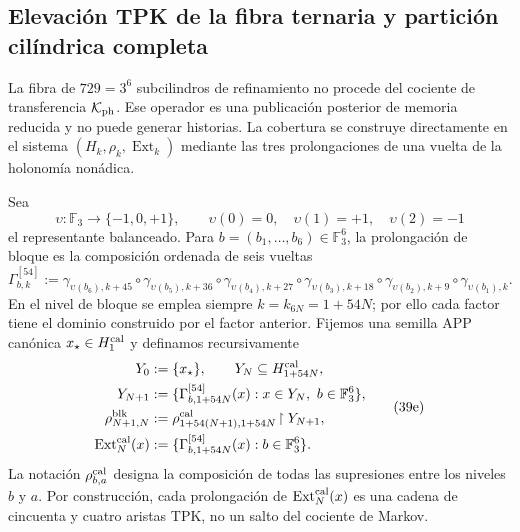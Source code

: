 \subsection{Elevación TPK de la fibra ternaria y partición cilíndrica completa}
\label{subsec:elevacion-catalogal-ch}

La fibra de \(729=3^6\) subcilindros de refinamiento no procede del cociente de transferencia
\(\mathcal K_{\rm ph}\). Ese operador es una publicación posterior de memoria
reducida y no puede generar historias. La cobertura se construye directamente
en el sistema \((H_k,\rho_k,\operatorname{Ext}_k)\) mediante las tres
prolongaciones de una vuelta de la holonomía nonádica.





Sea
\[
 \upsilon:\mathbb F_3\longrightarrow\{-1,0,+1\},\qquad
 \upsilon(0)=0,\quad\upsilon(1)=+1,\quad\upsilon(2)=-1
\]
el representante balanceado. Para
\(b=(b_1,\ldots,b_6)\in\mathbb F_3^6\), la prolongación de bloque es la
composición ordenada de seis vueltas
\[
 \Gamma_{b,k}^{[54]}:=
 \gamma_{\upsilon(b_6),k+45}\circ\gamma_{\upsilon(b_5),k+36}\circ
 \gamma_{\upsilon(b_4),k+27}\circ\gamma_{\upsilon(b_3),k+18}\circ
 \gamma_{\upsilon(b_2),k+9}\circ\gamma_{\upsilon(b_1),k}.
\tag{39d}
\label{eq:gamma-bloque-54-ch}
\]
En el nivel de bloque se emplea siempre
\(k=k_{6N}=1+54N\); por ello cada factor tiene el dominio construido por el
factor anterior.
Fijemos una semilla APP canónica \(x_\star\in H^{\rm cal}_1\) y definamos
recursivamente
\[
 \begin{aligned}
  Y_0&:=\{x_\star\},\qquad Y_N\subseteq H_{1+54N}^{\rm cal},\\
  Y_{N+1}&:=\{\Gamma_{b,1+54N}^{[54]}(x):
                 x\in Y_N,\ b\in\mathbb F_3^6\},\\
  \rho^{\rm blk}_{N+1,N}
    &:=\rho^{\rm cal}_{1+54(N+1),1+54N}
       \!\upharpoonright Y_{N+1},\\
  \operatorname{Ext}^{\rm cal}_N(x)
    &:=\{\Gamma_{b,1+54N}^{[54]}(x):b\in\mathbb F_3^6\}.
 \end{aligned}
\tag{39e}
\label{eq:sincronizacion-54-ch}
\]
La notación \(\rho^{\rm cal}_{b,a}\) designa la composición de todas las supresiones
entre los niveles \(b\) y \(a\). Por construcción, cada prolongación de
\(\operatorname{Ext}^{\rm cal}_N(x)\) es una cadena de cincuenta y cuatro
aristas TPK, no un salto del cociente de Markov.

